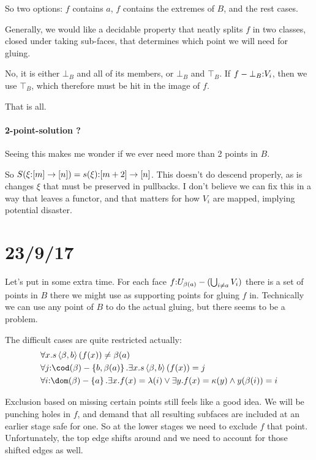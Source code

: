 \documentclass[csh.tex]{subfiles}
\begin{document}
So two options: $f$ contains $a$, $f$ contains the extremes of $B$, and the rest cases.

Generally, we would like a decidable property that neatly splits $f$ in two classes, closed under taking sub-faces, that determines which point we will need for gluing.

No, it is either $\bot_B$ and all of its members, or $\bot_B$ and $\top_B$. If $f-\bot_B\mathord : V_i$, then we use $\top_B$, which therefore must be hit in the image of $f$.

That is all.

\paragraph{2-point-solution ?}
Seeing this makes me wonder if we ever need more than 2 points in $B$. 

So $S(\xi\mathord :[m]\to[n])  = s(\xi)\mathord :[m + 2]\to [n]$. This doesn't do descend properly, as is changes $\xi$ that must be preserved in pullbacks. I don't believe we can fix this in a way that leaves a functor, and that matters for how $V_i$ are mapped, implying potential disaster.

\section{23/9/17}
Let's put in some extra time. For each face $f\mathord : U_{\beta(a)}-(\bigcup_{i\neq a}V_i)$ there is a set of points in $B$ there we might use as supporting points for gluing $f$ in. Technically we can use any point of $B$ to do the actual gluing, but there seems to be a problem.

The difficult cases are quite restricted actually:
\begin{align*}
&\forall x. s\tuplet{\beta,b}(f(x))\neq \beta(a)\\
&\forall j\of\cod(\beta) - \set{b,\beta(a)}.\exists x.s\tuplet{\beta,b}(f(x)) = j\\
&\forall i\of\dom(\beta) - \set a.\exists x.f(x) = \lambda(i) \vee \exists y.f(x) = \kappa(y) \land y(\beta(i)) = i
\end{align*}

Exclusion based on missing certain points still feels like a good idea. We will be punching holes in $f$, and demand that all resulting subfaces are included at an earlier stage safe for one. So at the lower stages we need to exclude $f$ that point. Unfortunately, the top edge shifts around and we need to account for those shifted edges as well.
\end{document}

